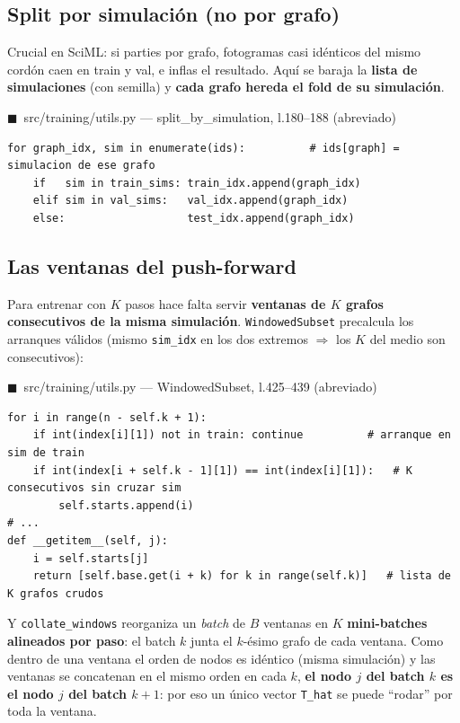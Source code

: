 \documentclass[11pt]{article}
\theoremstyle{definition}
\theoremstyle{plain}
\newcommand{\srcref}[1]{\par\smallskip\noindent
  {\footnotesize\ttfamily\textcolor{srcblue}{$\blacksquare$\ #1}}\par\vspace{1pt}}
\begin{document}
\subsection{Split por simulación (no por grafo)}

Crucial en SciML: si parties por grafo, fotogramas casi idénticos del mismo cordón
caen en train y val, e inflas el resultado. Aquí se baraja la \textbf{lista de
simulaciones} (con semilla) y \textbf{cada grafo hereda el fold de su simulación}.

\srcref{src/training/utils.py — split\_by\_simulation, l.180--188 (abreviado)}
\begin{lstlisting}
for graph_idx, sim in enumerate(ids):          # ids[graph] = simulacion de ese grafo
    if   sim in train_sims: train_idx.append(graph_idx)
    elif sim in val_sims:   val_idx.append(graph_idx)
    else:                   test_idx.append(graph_idx)
\end{lstlisting}

\subsection{Las ventanas del push-forward}

Para entrenar con $K$ pasos hace falta servir \textbf{ventanas de $K$ grafos
consecutivos de la misma simulación}. \texttt{WindowedSubset} precalcula los
arranques válidos (mismo \texttt{sim\_idx} en los dos extremos $\Rightarrow$ los $K$
del medio son consecutivos):

\srcref{src/training/utils.py — WindowedSubset, l.425--439 (abreviado)}
\begin{lstlisting}
for i in range(n - self.k + 1):
    if int(index[i][1]) not in train: continue          # arranque en sim de train
    if int(index[i + self.k - 1][1]) == int(index[i][1]):   # K consecutivos sin cruzar sim
        self.starts.append(i)
# ...
def __getitem__(self, j):
    i = self.starts[j]
    return [self.base.get(i + k) for k in range(self.k)]   # lista de K grafos crudos
\end{lstlisting}

Y \texttt{collate\_windows} reorganiza un \emph{batch} de $B$ ventanas en $K$
\textbf{mini-batches alineados por paso}: el batch $k$ junta el $k$-ésimo grafo de
cada ventana. Como dentro de una ventana el orden de nodos es idéntico (misma
simulación) y las ventanas se concatenan en el mismo orden en cada $k$, \textbf{el
nodo $j$ del batch $k$ es el nodo $j$ del batch $k{+}1$}: por eso un único vector
\texttt{T\_hat} se puede ``rodar'' por toda la ventana.
\end{document}
